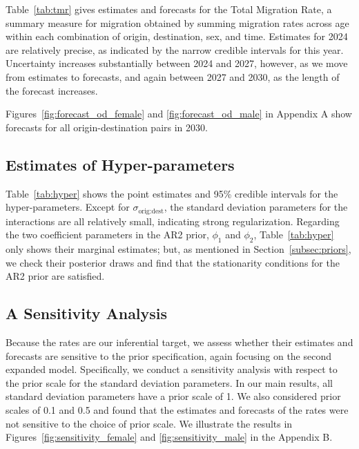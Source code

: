 \documentclass{article}
\begin{document}
{{\color{cyan} Table~\ref{tab:tmr} gives estimates and forecasts for the Total Migration Rate, a summary measure for migration obtained by summing migration rates across} {\color{magenta}age} {\color{cyan}within each combination of origin, destination, sex, and time. Estimates for 2024 are relatively precise, as indicated by the narrow credible intervals for this year. Uncertainty increases substantially between 2024 and 2027,} {\color{yellow}however,} {\color{magenta}as we move from estimates to forecasts,} {\color{cyan}and again between 2027 and 2030}{\color{magenta}, as the length of the forecast increases.}

{\color{magenta} Figures~\ref{fig:forecast_od_female} and \ref{fig:forecast_od_male} in Appendix A show forecasts for all origin-destination pairs in 2030.}
\clearpage




\subsection{{\color{magenta}Estimates of Hyper-parameters}}

{\color{magenta} Table~\ref{tab:hyper} shows the point estimates and 95\% credible intervals for the hyper-parameters. Except for $\sigma_{\text{orig:dest}}$, the standard deviation parameters for the interactions are all relatively small, indicating strong regularization. Regarding the two coefficient parameters in the AR2 prior, $\phi_1$ and $\phi_2$, Table~\ref{tab:hyper} only shows their marginal estimates; but, as mentioned in Section~\ref{subsec:priors}, we check their posterior draws and find that the stationarity conditions for the AR2 prior are satisfied.}



 \subsection{{\color{magenta}A Sensitivity Analysis}}

 {\color{magenta}Because the rates are our inferential target, we assess whether their estimates and forecasts are sensitive to the prior specification, again focusing on the second expanded model. Specifically, we conduct a sensitivity analysis with respect to the prior scale for the standard deviation parameters. In our main results, all standard deviation parameters have a prior scale of 1. We also considered prior scales of 0.1 and 0.5 and found that the estimates and forecasts of the rates were not sensitive to the choice of prior scale. We illustrate the results in Figures~\ref{fig:sensitivity_female} and \ref{fig:sensitivity_male} in the Appendix B.}


}
\end{document}
